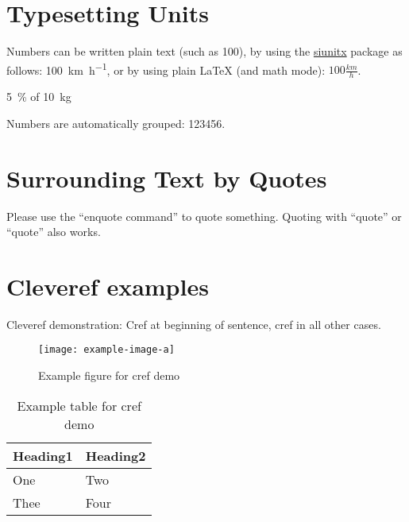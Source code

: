 \documentclass[
  numbers=noenddot,
  english,  %
  a4paper,  %
  twoside,  %
  bibliography=totoc,
  headsepline,
  cleardoublepage=empty,
  parskip=half,
  draft=false
]{scrbook}
\theoremstyle{break}
\begin{document}
\section{Typesetting Units}

\begin{ltgexample}
Numbers can be written plain text (such as 100), by using the \href{https://ctan.org/pkg/siunitx}{siunitx} package as follows:
\SI{100}{\km\per\hour},
or by using plain \LaTeX{} (and math mode):
$100 \frac{\mathit{km}}{h}$.
\end{ltgexample}

\begin{ltgexample}
\SI{5}{\percent} of \SI{10}{kg}
\end{ltgexample}

\begin{ltgexample}
Numbers are automatically grouped: \num{123456}.
\end{ltgexample}

\section{Surrounding Text by Quotes}

\begin{ltgexample}
Please use the \enquote{enquote command} to quote something.
Quoting with "`quote"' or ``quote'' also works.

\end{ltgexample}

\section{Cleveref examples}
\label{sec:ex:cref}

Cleveref demonstration: Cref at beginning of sentence, cref in all other cases.

\begin{figure}
  \centering
  \texttt{[image: example-image-a]}
  \caption{Example figure for cref demo}
  \label{fig:ex:cref}
\end{figure}

\begin{table}
  \centering
  \begin{tabular}{ll}
    \toprule
    Heading1 & Heading2 \\
    \midrule
    One      & Two      \\
    Thee     & Four     \\
    \bottomrule
  \end{tabular}
  \caption{Example table for cref demo}
  \label{tab:ex:cref}
\end{table}
\end{document}
